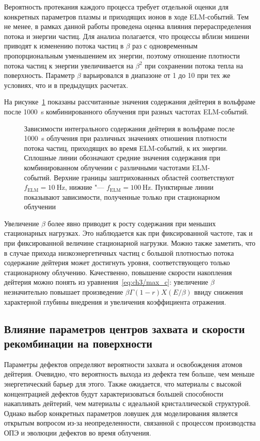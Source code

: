 Вероятность протекания каждого процесса требует отдельной оценки для конкретных параметров плазмы и приходящих ионов в ходе ELM-событий. Тем не менее, в рамках данной работы проведена оценка влияния перераспределения потока и энергии частиц. Для анализа полагается, что процессы вблизи мишени приводят к изменению потока частиц в \( \beta \) раз с одновременным пропорциональным уменьшением их энергии, поэтому отношение плотности потока частиц к энергии увеличивается на $\beta^2$ при сохранении потока тепла на поверхность. Параметр $\beta$ варьировался в диапазоне от 1 до 10 при тех же условиях, что и в предыдущих расчетах. 

На рисунке~\cref{fig:ch3/beta_var} показаны рассчитанные значения содержания дейтерия в вольфраме после \SI{1000}{\second} комбинированного облучения при разных частотах ELM-событий. 
\begin{figure}[ht]
	\caption{Зависимости интегрального содержания дейтерия в вольфраме после \SI{1000}{\second} облучения при различных значениях отношения плотности потока частиц, приходящих во время ELM-событий, к их энергии. Сплошные линии обозначают средние значения содержания при комбинированном облучении с различными частотами ELM-событий. Верхние границы заштрихованных областей соответствуют \(f_\mathrm{ELM} = \SI{10}{\hertz}\), нижние "--- \(f_\mathrm{ELM} = \SI{100}{\hertz}\). Пунктирные линии показывают зависимости, полученные только при стационарном облучении}\label{fig:ch3/beta_var}
\end{figure}
Увеличение $\beta$ более явно приводит к росту содержания при меньших стационарных нагрузках. Это наблюдается как при фиксированной частоте, так и при фиксированной величине стационарной нагрузки. Можно также заметить, что в случае прихода низкоэнергетичных частиц с большой плотностью потока содержание дейтерия может достигнуть уровня, соответствующего только стационарному облучению. Качественно, повышение скорости накопления дейтерия можно понять из уравнения~\cref{eq:ch3/max_c}: увеличение $\beta$ незначительно повышает произведение $\beta\Gamma (1-r) X(E/\beta)$ ввиду снижения характерной глубины внедрения и увеличения коэффициента отражения. 

\subsection{Влияние параметров центров захвата и скорости рекомбинации на поверхности}

Параметры дефектов определяют вероятности захвата и освобождения атомов дейтерия. Очевидно, что вероятность выхода из дефекта тем больше, чем меньше энергетический барьер для этого. Также ожидается, что материалы с высокой концентрацией дефектов будут характеризоваться большей способности накапливать дейтерий, чем материалы с идеальной кристаллической структурой. Однако выбор конкретных параметров ловушек для моделирования является открытым вопросом из-за неопределенности, связанной с процессом производства ОПЭ и эволюции дефектов во время облучения.

